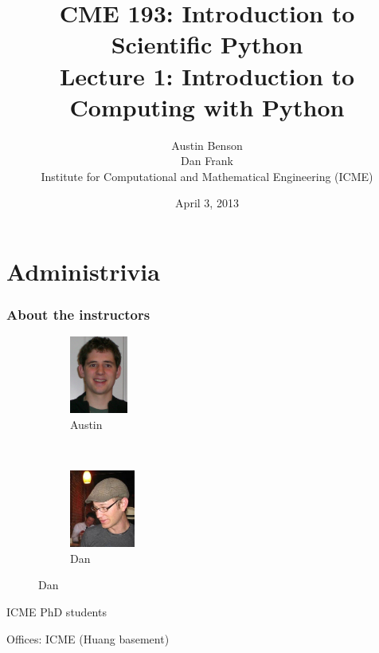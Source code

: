 \documentclass{beamer}
\title{CME 193: Introduction to Scientific Python \\
Lecture 1: Introduction to Computing with Python}
\author{Austin Benson \\
\vspace{0.1in}
Dan Frank \\
\vspace{0.1in}
Institute for Computational and Mathematical Engineering (ICME)}
\date{April 3, 2013}
\begin{document}
\maketitle

\section{Administrivia}
\begin{frame}
\frametitle{About the instructors}

\begin{figure}
        \centering
	\begin{subfigure}[b]{0.45\textwidth}
	\centering
	\includegraphics[height=1in]{"images/austin"}
	\caption{Austin}
	\label{fig:hw2_15a}
	\end{subfigure}
        ~ %
	\begin{subfigure}[b]{0.45\textwidth}
	\centering
	\includegraphics[height=1in]{"images/dan"}
	\caption{Dan}
	\label{fig:hw2_15b}
	\end{subfigure}
\end{figure}

ICME PhD students

Offices: ICME (Huang basement)
\end{frame}


\end{document}
